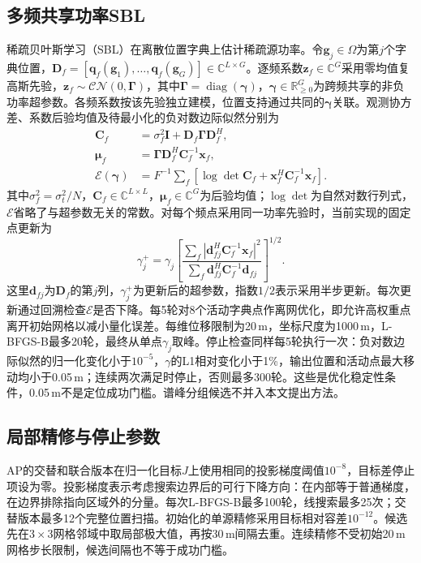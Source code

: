 \documentclass[a4paper]{cas-sc}
\numberwithin{equation}{section}
\numberwithin{figure}{section}
\numberwithin{table}{section}
\newcommand{\R}{\mathbb R}
\newcommand{\C}{\mathbb C}
\newcommand{\diag}{\operatorname{diag}}
\begin{document}
\subsection{多频共享功率SBL}
稀疏贝叶斯学习（SBL）在离散位置字典上估计稀疏源功率。令$\bm g_j\in\Omega$为第$j$个字典位置，$\bm D_f=[\bm q_f(\bm g_1),\ldots,\bm q_f(\bm g_G)]\in\C^{L\times G}$。逐频系数$\bm z_f\in\C^G$采用零均值复高斯先验，$\bm z_f\sim\mathcal{CN}(0,\bm\Gamma)$，其中$\bm\Gamma=\diag(\bm\gamma)$，$\bm\gamma\in\R_{\ge0}^G$为跨频共享的非负功率超参数\cite{Nannuru2019}。各频系数按该先验独立建模，位置支持通过共同的$\bm\gamma$关联。观测协方差、系数后验均值及待最小化的负对数边际似然分别为
\begin{align}
 \bm C_f&=\sigma_f^2\bm I+\bm D_f\bm\Gamma\bm D_f^H,\label{eq:sblCov}\\
 \bm\mu_f&=\bm\Gamma\bm D_f^H\bm C_f^{-1}\bm x_f,\nonumber\\
 \mathcal E(\bm\gamma)&=F^{-1}\sum_f[\log\det\bm C_f+\bm x_f^H\bm C_f^{-1}\bm x_f] .\label{eq:sblEvidence}
\end{align}
其中$\sigma_f^2=\sigma_t^2/N$，$\bm C_f\in\C^{L\times L}$，$\bm\mu_f\in\C^G$为后验均值；$\log\det$为自然对数行列式，$\mathcal E$省略了与超参数无关的常数。对每个频点采用同一功率先验时，当前实现的固定点更新为
\begin{equation}
 \gamma_j^+=\gamma_j\left[
 \frac{\sum_f|\bm d_{fj}^H\bm C_f^{-1}\bm x_f|^2}
 {\sum_f\bm d_{fj}^H\bm C_f^{-1}\bm d_{fj}}
 \right]^{1/2} .\label{eq:sblUpdate}
\end{equation}
这里$\bm d_{fj}$为$\bm D_f$的第$j$列，$\gamma_j^+$为更新后的超参数，指数$1/2$表示采用半步更新。每次更新通过回溯检查$\mathcal E$是否下降。每5轮对8个活动字典点作离网优化，即允许高权重点离开初始网格以减小量化误差。每维位移限制为20\,m，坐标尺度为1000\,m，L-BFGS-B最多20轮，最终从单点$\gamma_j$取峰。停止检查同样每5轮执行一次：负对数边际似然的归一化变化小于$10^{-5}$，$\gamma$的L1相对变化小于1\%，输出位置和活动点最大移动均小于0.05\,m；连续两次满足时停止，否则最多300轮。这些是优化稳定性条件，0.05\,m不是定位成功门槛。谱峰分组候选不并入本文提出方法。

\subsection{局部精修与停止参数}
AP的交替和联合版本在归一化目标$J$上使用相同的投影梯度阈值$10^{-8}$，目标差停止项设为零。投影梯度表示考虑搜索边界后的可行下降方向：在内部等于普通梯度，在边界排除指向区域外的分量。每次L-BFGS-B最多100轮，线搜索最多25次；交替版本最多12个完整位置扫描。初始化的单源精修采用目标相对容差$10^{-12}$。候选先在$3\times3$网格邻域中取局部极大值，再按30\,m间隔去重。连续精修不受初始20\,m网格步长限制，候选间隔也不等于成功门槛。
\end{document}
